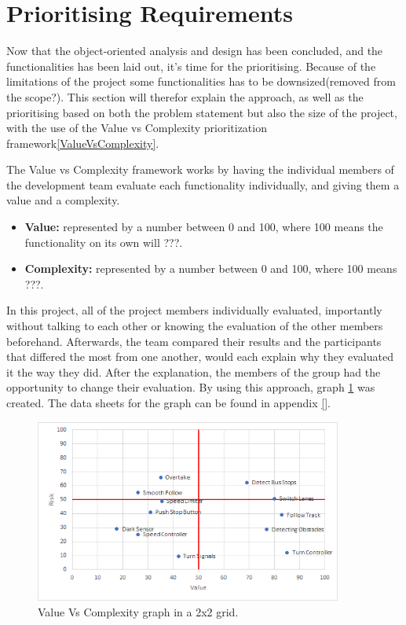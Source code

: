 \section{Prioritising Requirements}\label{section_riskVsValue}

Now that the object-oriented analysis and design has been concluded, and the functionalities has been laid out, it's time for the prioritising. Because of the limitations of the project some functionalities has to be downsized(removed from the scope?). This section will therefor explain the approach, as well as the prioritising based on both the problem statement but also the size of the project, with the use of the Value vs Complexity prioritization framework\ref{ValueVsComplexity}.

The Value vs Complexity framework works by having the individual members of the development team evaluate each functionality individually, and giving them a value and a complexity.

\begin{itemize}
  \item \textbf{Value:} represented by a number between 0 and 100, where 100 means the functionality on its own will ???.
  
  \item \textbf{Complexity:} represented by a number between 0 and 100, where 100 means ???. 
\end{itemize}

In this project, all of the project members individually evaluated, importantly without talking to each other or knowing the evaluation of the other members beforehand. Afterwards, the team compared their results and the participants that differed the most from one another, would each explain why they evaluated it the way they did. After the explanation, the members of the group had the opportunity to change their evaluation. By using this approach, graph \ref{fig:ValueVsComplexity} was created. The data sheets for the graph can be found in appendix \ref{}.

\begin{figure}[H]
    \centering
	\includegraphics[width=0.9\textwidth]{Images/Graphs/RiskValue.png}
    \caption{Value Vs Complexity graph in a 2x2 grid.}
    \label{fig:ValueVsComplexity}
\end{figure}

